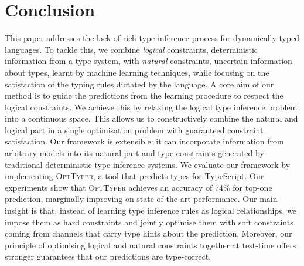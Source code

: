 \documentclass[acmsmall,nonacm]{acmart}\settopmatter{printfolios=true,printccs=false,printacmref=false}
\newcommand{\projectname}{\textsc{OptTyper}\xspace}
\begin{document}
\section{Conclusion}\label{sec:conclusion}

This paper addresses the lack of rich type inference process for dynamically typed languages.
To tackle this, we combine \textit{logical} constraints, deterministic information from a type system, with \textit{natural} constraints, uncertain information about types, learnt by machine learning techniques, while focusing on the satisfaction of the typing rules dictated by the language.
A core aim of our method is to guide the predictions from the learning procedure to respect the logical constraints.
We achieve this by relaxing the logical type inference problem into a continuous space.
%
This allows us to constructively combine the natural and logical part in a single optimisation problem with guaranteed constraint satisfaction. 
Our framework is extensible: it can incorporate information from arbitrary models into its natural part and type constraints generated by traditional deterministic type inference systems.
We evaluate our framework by implementing \projectname{}, a tool that predicts types for TypeScript.
Our experiments show that \projectname{} achieves an accuracy of 74\% for top-one prediction, marginally improving on state-of-the-art performance.
Our main insight is that, instead of learning type inference rules as logical relationships, we impose them as hard constraints and jointly optimise them with soft constraints coming from channels that carry type hints about the prediction.
Moreover, our principle of optimising logical and natural constraints together at test-time offers stronger guarantees that our predictions are type-correct.
\end{document}
